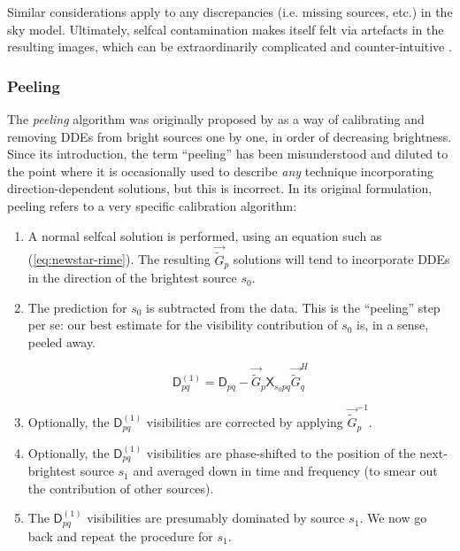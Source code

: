 \documentclass{aa}
\newcommand{\herm}{H}
\newcommand{\jones}[2]{\vec {#1}_{#2}}
\newcommand{\jonesinv}[2]{\vec {#1}^{-1}_{#2}}
\newcommand{\jonesT}[2]{\vec {#1}^{\herm}_{#2}}
\newcommand{\coh}[2]{\mathsf{{#1}}_{{#2}}}
\begin{document}
Similar considerations apply to any discrepancies (i.e. missing sources, etc.) in the sky model. Ultimately, selfcal contamination makes itself felt via artefacts in the resulting images, which can be extraordinarily complicated and counter-intuitive \citep[for an example, see Fig.~17 of Paper III,][]{RRIME3}.

\subsubsection{Peeling\label{sec:peeling}}

The \emph{peeling} algorithm was originally proposed by \citet{JEN:peeling} as a way of calibrating and removing DDEs from bright sources one by one, in order of decreasing brightness. Since its introduction, the term ``peeling'' has been misunderstood and diluted to the point where it is occasionally used to describe {\em any} technique incorporating direction-dependent solutions, but this is incorrect. In its original formulation, peeling refers to a very specific calibration algorithm:

\begin{enumerate}

\item A normal selfcal solution is performed, using an equation such as (\ref{eq:newstar-rime}). The resulting $\jones{\tilde{G}}{p}$ solutions will tend to incorporate DDEs in the direction of the brightest source $s_0$.

\item The prediction for $s_0$ is subtracted from the data. This is the ``peeling'' step per se: our best estimate for the visibility contribution of $s_0$ is, in a sense, peeled away.

\[
\coh{D}{pq}^{(1)} = \coh{D}{pq} - \jones{\tilde{G}}{p} \coh{X}{s_0 pq} \jonesT{\tilde{G}}{q}
\]

\item Optionally, the $\coh{D}{pq}^{(1)}$ visibilities are corrected by applying $\jonesinv{\tilde{G}}{p}$.

\item Optionally, the $\coh{D}{pq}^{(1)}$ visibilities are phase-shifted to the position of the next-brightest source $s_1$ and averaged down in time and frequency (to smear out the contribution of other sources).
 
\item The $\coh{D}{pq}^{(1)}$ visibilities are presumably dominated by source $s_1$. We now go back and repeat the procedure for $s_1$.

\end{enumerate}
\end{document}

